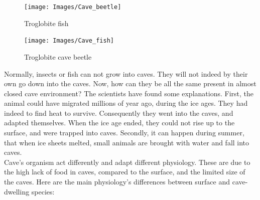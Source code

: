\documentclass{article}
\begin{document}
\begin{figure}[ht]
    \begin{minipage}[c]{.46\linewidth}
        \centering
        \texttt{[image: Images/Cave\_beetle]}
        \caption{Troglobite fish \cite{CaveBeetle}}
    \end{minipage}
    \hfill%
    \begin{minipage}[c]{.46\linewidth}
        \centering
        \texttt{[image: Images/Cave\_fish]}
        \caption{Troglobite cave beetle \cite{CaveFish}}
    \end{minipage}
\end{figure}

Normally, insects or fish can not grow into caves. They will not indeed by their own go down into the caves. Now, how can they be all the same present in almost closed cave environment? The scientists have found some explanations. First, the animal could have migrated millions of year ago, during the ice ages. They had indeed to find heat to survive. Consequently they went into the caves, and adapted themselves. When the ice age ended, they could not rise up to the surface, and were trapped into caves. Secondly, it can happen during summer, that when ice sheets melted, small animals are brought with water and fall into caves.
\\
Cave’s organism act differently and adapt different physiology. These are due to the high lack of food in caves, compared to the surface, and the limited size of the caves. Here are the main physiology’s differences between surface and cave-dwelling species:
\end{document}
